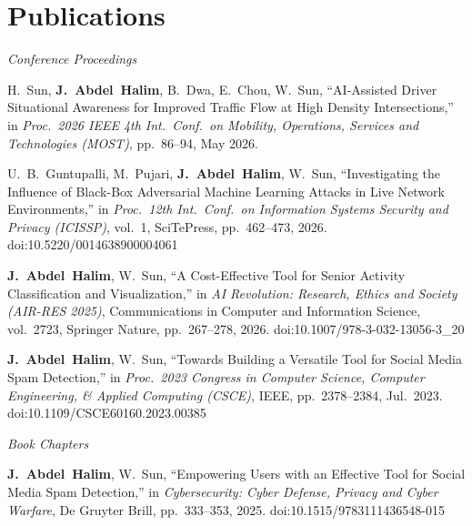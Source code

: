 \documentclass[11pt,a4paper]{article}
\newcommand{\me}{\textbf{J.~Abdel~Halim}}
\begin{document}
\section{Publications}
\textit{Conference Proceedings}
\begin{enumerate}[label={[C\arabic*]}, leftmargin=2.6em, itemsep=3pt, topsep=3pt]
  \item H.~Sun, \me, B.~Dwa, E.~Chou, W.~Sun, ``AI-Assisted Driver Situational
        Awareness for Improved Traffic Flow at High Density Intersections,''
        in \textit{Proc.\ 2026 IEEE 4th Int.\ Conf.\ on Mobility, Operations, Services
        and Technologies (MOST)}, pp.~86--94, May 2026.
  \item U.~B.~Guntupalli, M.~Pujari, \me, W.~Sun, ``Investigating the Influence of
        Black-Box Adversarial Machine Learning Attacks in Live Network Environments,''
        in \textit{Proc.\ 12th Int.\ Conf.\ on Information Systems Security and Privacy
        (ICISSP)}, vol.~1, SciTePress, pp.~462--473, 2026. doi:10.5220/0014638900004061
  \item \me, W.~Sun, ``A Cost-Effective Tool for Senior Activity Classification and
        Visualization,'' in \textit{AI Revolution: Research, Ethics and Society
        (AIR-RES 2025)}, Communications in Computer and Information Science, vol.~2723,
        Springer Nature, pp.~267--278, 2026. doi:10.1007/978-3-032-13056-3\_20
  \item \me, W.~Sun, ``Towards Building a Versatile Tool for Social Media Spam
        Detection,'' in \textit{Proc.\ 2023 Congress in Computer Science, Computer
        Engineering, \& Applied Computing (CSCE)}, IEEE, pp.~2378--2384, Jul.\ 2023.
        doi:10.1109/CSCE60160.2023.00385
\end{enumerate}

\textit{Book Chapters}
\begin{enumerate}[label={[B\arabic*]}, leftmargin=2.6em, itemsep=3pt, topsep=3pt]
  \item \me, W.~Sun, ``Empowering Users with an Effective Tool for Social Media Spam
        Detection,'' in \textit{Cybersecurity: Cyber Defense, Privacy and Cyber
        Warfare}, De Gruyter Brill, pp.~333--353, 2025.
        doi:10.1515/9783111436548-015
\end{enumerate}

\end{document}
